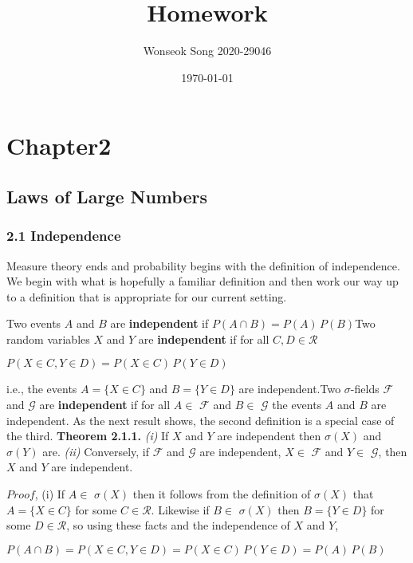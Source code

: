 \documentclass[10pt]{oblivoir}
\begin{document}
\title{Homework}

\author{Wonseok Song 2020-29046}

\date{\today}

\maketitle

\section*{\Large{Chapter2}}

\subsection*{\LARGE{Laws of Large Numbers}}


\subsubsection*{\large{2.1 Independence}}

Measure theory ends and probability begins with the definition of independence. We begin with what is hopefully a familiar definition and then work our way up to a definition that is appropriate for our current setting.

\begin{flushleft}Two events $A$ and $B$ are \textbf{independent} if $P(A \cap B)=P(A)\,P(B)$\linebreak Two random variables $X$ and $Y$ are \textbf{independent} if for all $C,D \in \mathcal{R}$\end{flushleft}

\begin{center}$P(X \in C,Y \in D)=P(X \in C)\, P(Y \in D)$\end{center}

\begin{flushleft} i.e., the events $A=\{ X\in C \}$ and $B=\{ Y\in D \}$ are independent.\linebreak Two $\sigma$-fields $\mathcal{F}$ and $\mathcal{G}$ are \textbf{independent} if for all $A \in$ $\mathcal{F}$ and $B \in$ $\mathcal{G}$ the events $A$ and $B$ are independent.
\linebreak As the next result shows, the second definition is a special case of the third.\linebreak
\textbf{Theorem 2.1.1.} \textit{(i)} If $X$ and $Y$ are independent then $\sigma(X)$ and $\sigma(Y)$ are. \textit{(ii)} Conversely, if $\mathcal{F}$ and $\mathcal{G}$ are independent, $X \in$ $\mathcal{F}$ and $Y \in$ $\mathcal{G}$, then $X$ and $Y$ are independent. 

$Proof$, (i) If  $A \in$ $\sigma(X)$ then it follows from the definition of $\sigma(X)$ that $A=\{ X\in C \}$ for some $C \in \mathcal{R}$. Likewise if  $B \in$ $\sigma(X)$ then $B= \{ Y\in D \}$ for some $D \in \mathcal{R}$, so using these facts and the independence of $X$ and $Y$,\end{flushleft}
\begin{center}$P(A \cap B)=P(X \in C, Y \in D)=P(X \in C)\, P(Y \in D)=P(A)\,P(B)$\end{center}
\end{document}
